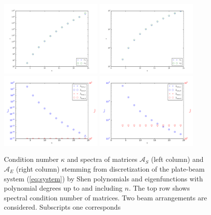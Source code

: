 \documentclass{marine_2015}
\begin{document}
 \begin{figure}[t!]
 \centering
 \includegraphics[width=0.45\textwidth]{img/shen_cond}
 \includegraphics[width=0.45\textwidth]{img/sine_cond}\\
 \includegraphics[width=0.45\textwidth]{img/shen_spectrum}
 \includegraphics[width=0.45\textwidth]{img/sine_spectrum}\\
 \caption{Condition number $\kappa$ and spectra of matrices $\mathcal{A}_S$
   (left column) and $\mathcal{A}_E$ (right column) stemming from discretization 
   of the plate-beam system (\ref{eq:system}) by Shen polynomials and eigenfunctions 
   with polynomial degrees up to and including $n$. The top row shows spectral condition 
   number of matrices. Two beam arrangements are considered. Subscripts one corresponds 
}
\end{figure}
\end{document}
